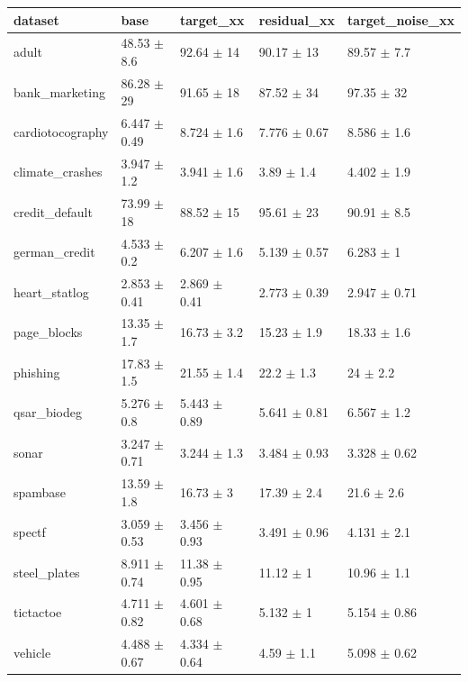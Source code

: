 \begin{tabular}{lllll}
\toprule
dataset & base & target\_xx & residual\_xx & target\_noise\_xx \\
\midrule
adult & 48.53 $\pm$ 8.6 & 92.64 $\pm$ 14 & 90.17 $\pm$ 13 & 89.57 $\pm$ 7.7 \\
bank\_marketing & 86.28 $\pm$ 29 & 91.65 $\pm$ 18 & 87.52 $\pm$ 34 & 97.35 $\pm$ 32 \\
cardiotocography & 6.447 $\pm$ 0.49 & 8.724 $\pm$ 1.6 & 7.776 $\pm$ 0.67 & 8.586 $\pm$ 1.6 \\
climate\_crashes & 3.947 $\pm$ 1.2 & 3.941 $\pm$ 1.6 & 3.89 $\pm$ 1.4 & 4.402 $\pm$ 1.9 \\
credit\_default & 73.99 $\pm$ 18 & 88.52 $\pm$ 15 & 95.61 $\pm$ 23 & 90.91 $\pm$ 8.5 \\
german\_credit & 4.533 $\pm$ 0.2 & 6.207 $\pm$ 1.6 & 5.139 $\pm$ 0.57 & 6.283 $\pm$ 1 \\
heart\_statlog & 2.853 $\pm$ 0.41 & 2.869 $\pm$ 0.41 & 2.773 $\pm$ 0.39 & 2.947 $\pm$ 0.71 \\
page\_blocks & 13.35 $\pm$ 1.7 & 16.73 $\pm$ 3.2 & 15.23 $\pm$ 1.9 & 18.33 $\pm$ 1.6 \\
phishing & 17.83 $\pm$ 1.5 & 21.55 $\pm$ 1.4 & 22.2 $\pm$ 1.3 & 24 $\pm$ 2.2 \\
qsar\_biodeg & 5.276 $\pm$ 0.8 & 5.443 $\pm$ 0.89 & 5.641 $\pm$ 0.81 & 6.567 $\pm$ 1.2 \\
sonar & 3.247 $\pm$ 0.71 & 3.244 $\pm$ 1.3 & 3.484 $\pm$ 0.93 & 3.328 $\pm$ 0.62 \\
spambase & 13.59 $\pm$ 1.8 & 16.73 $\pm$ 3 & 17.39 $\pm$ 2.4 & 21.6 $\pm$ 2.6 \\
spectf & 3.059 $\pm$ 0.53 & 3.456 $\pm$ 0.93 & 3.491 $\pm$ 0.96 & 4.131 $\pm$ 2.1 \\
steel\_plates & 8.911 $\pm$ 0.74 & 11.38 $\pm$ 0.95 & 11.12 $\pm$ 1 & 10.96 $\pm$ 1.1 \\
tictactoe & 4.711 $\pm$ 0.82 & 4.601 $\pm$ 0.68 & 5.132 $\pm$ 1 & 5.154 $\pm$ 0.86 \\
vehicle & 4.488 $\pm$ 0.67 & 4.334 $\pm$ 0.64 & 4.59 $\pm$ 1.1 & 5.098 $\pm$ 0.62 \\
\bottomrule
\end{tabular}
